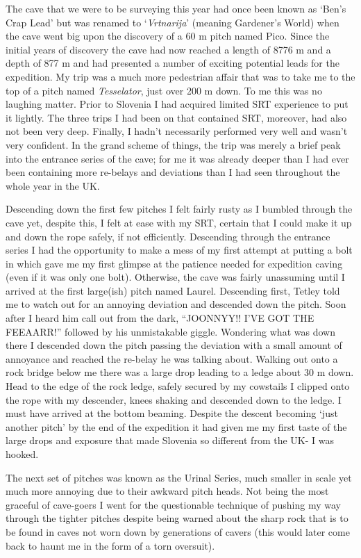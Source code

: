 The cave that we were to be surveying this year had once been known as
`Ben's Crap Lead' but was renamed to `\emph{Vrtnarija}' (meaning
Gardener's World) when the cave went big upon the discovery of a 60 m
pitch named Pico. Since the initial years of discovery the cave had now
reached a length of 8776 m and a depth of 877 m and had presented a
number of exciting potential leads for the expedition. My trip was a
much more pedestrian affair that was to take me to the top of a pitch
named \emph{Tesselator}, just over 200 m down. To me this was no
laughing matter. Prior to Slovenia I had acquired limited SRT experience
to put it lightly. The three trips I had been on that contained SRT,
moreover, had also not been very deep. Finally, I hadn't necessarily
performed very well and wasn't very confident. In the grand scheme of
things, the trip was merely a brief peak into the entrance series of the
cave; for me it was already deeper than I had ever been containing more
re-belays and deviations than I had seen throughout the whole year in
the UK.

Descending down the first few pitches I felt fairly rusty as I bumbled
through the cave yet, despite this, I felt at ease with my SRT, certain
that I could make it up and down the rope safely, if not efficiently.
Descending through the entrance series I had the opportunity to make a
mess of my first attempt at putting a bolt in which gave me my first
glimpse at the patience needed for expedition caving (even if it was
only one bolt). Otherwise, the cave was fairly unassuming until I
arrived at the first large(ish) pitch named Laurel. Descending first,
Tetley told me to watch out for an annoying deviation and descended down
the pitch. Soon after I heard him call out from the dark, ``JOONNYY!!
I'VE GOT THE FEEAARR!'' followed by his unmistakable giggle. Wondering
what was down there I descended down the pitch passing the deviation
with a small amount of annoyance and reached the re-belay he was talking
about. Walking out onto a rock bridge below me there was a large drop
leading to a ledge about 30 m down. Head to the edge of the rock ledge,
safely secured by my cowstails I clipped onto the rope with my
descender, knees shaking and descended down to the ledge. I must have
arrived at the bottom beaming. Despite the descent becoming `just
another pitch' by the end of the expedition it had given me my first
taste of the large drops and exposure that made Slovenia so different
from the UK- I was hooked.

The next set of pitches was known as the Urinal Series, much smaller in
scale yet much more annoying due to their awkward pitch heads. Not being
the most graceful of cave-goers I went for the questionable technique of
pushing my way through the tighter pitches despite being warned about
the sharp rock that is to be found in caves not worn down by generations
of cavers (this would later come back to haunt me in the form of a torn
oversuit).

